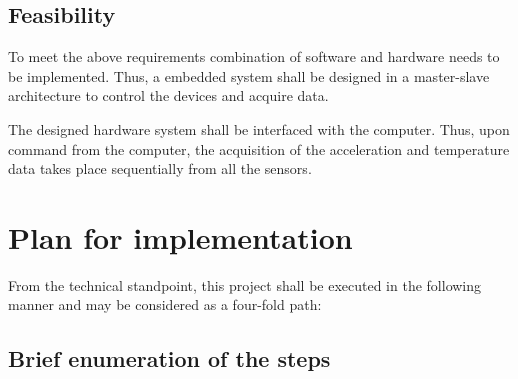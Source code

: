 \documentclass{FR16}
\begin{document}
\subsection{Feasibility}
To meet the above requirements combination of software and hardware needs to be implemented. Thus, a embedded system shall be designed in a master-slave architecture to control the devices and acquire data.

The designed hardware system shall be interfaced with the computer. Thus, upon command from the computer, the acquisition of the acceleration and temperature data takes place sequentially from all the sensors.  










\newpage
\section{Plan for implementation}
From the technical standpoint, this project shall be executed in the following manner and may be considered as a four-fold path:
\subsection{Brief enumeration of the steps}
\end{document}
